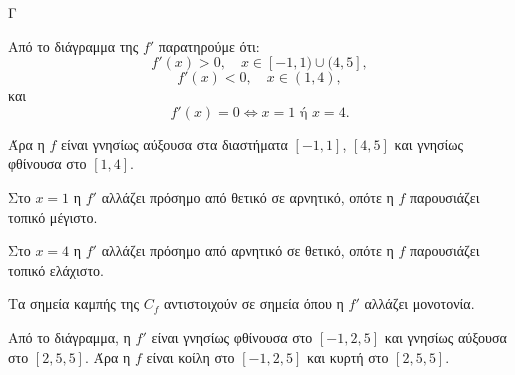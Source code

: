 

\begin{thema}{Γ}

\begin{center}
\end{center}

\begin{erwthma}
\item Από το διάγραμμα της $f'$ παρατηρούμε ότι:
\[
f'(x)>0,\quad x\in[-1,1)\cup(4,5],
\]
\[
f'(x)<0,\quad x\in(1,4),
\]
και
\[
f'(x)=0 \Leftrightarrow x=1 \text{ ή } x=4.
\]

Άρα η $f$ είναι γνησίως αύξουσα στα διαστήματα $[-1,1]$, $[4,5]$ και γνησίως φθίνουσα στο $[1,4]$.

Στο $x=1$ η $f'$ αλλάζει πρόσημο από θετικό σε αρνητικό, οπότε η $f$ παρουσιάζει τοπικό μέγιστο.

Στο $x=4$ η $f'$ αλλάζει πρόσημο από αρνητικό σε θετικό, οπότε η $f$ παρουσιάζει τοπικό ελάχιστο.

\item Τα σημεία καμπής της $C_f$ αντιστοιχούν σε σημεία όπου η $f'$ αλλάζει μονοτονία.

Από το διάγραμμα, η $f'$ είναι γνησίως φθίνουσα στο $[-1,2{,}5]$ και γνησίως αύξουσα στο $[2{,}5,5]$. Άρα η $f$ είναι κοίλη στο $[-1,2{,}5]$ και κυρτή στο $[2{,}5,5]$.


\end{erwthma}
\end{thema}
